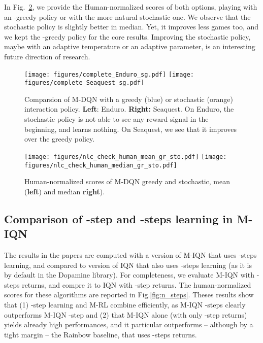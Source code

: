 \documentclass{article}
\begin{document}
In Fig.~\ref{fig:gr_sto_human}, we provide the Human-normalized scores of both options, playing with an -greedy policy or with the more natural stochastic one. We observe that the stochastic policy is slightly better in median. Yet, it improves less games too, and we kept the -greedy policy for the core results. Improving the stochastic policy, maybe with an adaptive temperature or an adaptive  parameter, is an interesting future direction of research.



\begin{figure}
    \centering
    \texttt{[image: figures/complete\_Enduro\_sg.pdf]}
\texttt{[image: figures/complete\_Seaquest\_sg.pdf]}
    \caption{Comparsion of M-DQN with a greedy (blue) or stochastic (orange) interaction policy. \textbf{Left}: Enduro. \textbf{Right:} Seaquest. On Enduro, the stochastic policy is not able to see any reward signal in the beginning, and learns nothing. On Seaquest, we see that it improves over the greedy policy.}
    \label{fig:g_sto_games}
\end{figure}

\begin{figure}
    \centering
     \texttt{[image: figures/nlc\_check\_human\_mean\_gr\_sto.pdf]}
    \texttt{[image: figures/nlc\_check\_human\_median\_gr\_sto.pdf]}
    \caption{Human-normalized scores of M-DQN greedy and stochastic, mean (\textbf{left}) and median \textbf{right}).}
    \label{fig:gr_sto_human}
\end{figure}

\subsection{Comparison of -step and -steps learning in M-IQN}
\label{subappx:n_steps}
The results in the papers are computed with a version of M-IQN that uses -steps learning, and compared to version of IQN that also uses -steps learning (as it is by default in the Dopamine library). For completeness, we evaluate M-IQN with -steps returns, and compre it to IQN with -step returns. The human-normalized scores for these algorithms are reported in Fig.\ref{fig:n_steps}. Theses results show that (1) -step learning and M-RL combine efficiently, as M-IQN -steps clearly outperforms M-IQN -step and (2) that M-IQN alone (with only -step returns) yields already high performances, and it particular outperforms -- although by a tight margin -- the Rainbow baseline, that uses -steps returns.
\end{document}
